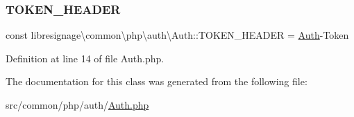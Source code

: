 \subsubsection{\texorpdfstring{T\+O\+K\+E\+N\+\_\+\+H\+E\+A\+D\+ER}{TOKEN\_HEADER}}
{\footnotesize\ttfamily const libresignage\textbackslash{}common\textbackslash{}php\textbackslash{}auth\textbackslash{}\+Auth\+::\+T\+O\+K\+E\+N\+\_\+\+H\+E\+A\+D\+ER = \textquotesingle{}\hyperlink{classlibresignage_1_1common_1_1php_1_1auth_1_1Auth}{Auth}-\/Token\textquotesingle{}}



Definition at line 14 of file Auth.\+php.



The documentation for this class was generated from the following file\+:\begin{DoxyCompactItemize}
\item 
src/common/php/auth/\hyperlink{Auth_8php}{Auth.\+php}\end{DoxyCompactItemize}

